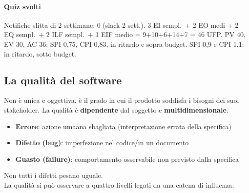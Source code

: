 \documentclass[12pt]{extarticle}
\begin{document}
\paragraph{Quiz svolti} Notifiche slitta di 2 settimane: 0 (slack 2 sett.). 3 EI sempl.\ + 2 EO medi + 2 EQ sempl.\ + 2 ILF sempl.\ + 1 EIF medio = 9+10+6+14+7 = 46 UFP. PV 40, EV 30, AC 36: SPI 0,75, CPI 0,83, in ritardo e sopra budget. SPI 0,9 e CPI 1,1: in ritardo, sotto budget.

\newpage

\subsection{La qualità del software}
Non è unica e oggettiva, è il grado in cui il prodotto soddisfa i bisogni dei suoi stakeholder. La qualità è \textbf{dipendente} dal soggetto e \textbf{multidimensionale}.\\

\begin{itemize}
    \item \textbf{Errore}: azione umaana sbagliata (interpretazione errata della specifica)
    \item \textbf{Difetto (bug)}: imperfezione nel codice/in un documento
    \item \textbf{Guasto (failure)}: comportamento osservabile non previsto dalla specifica
\end{itemize}
Non tutti i difetti pesano uguale.\\

\noindent La qualità si può osservare a quattro livelli legati da una catena di influenza:
\begin{center}
\end{center}
\end{document}
